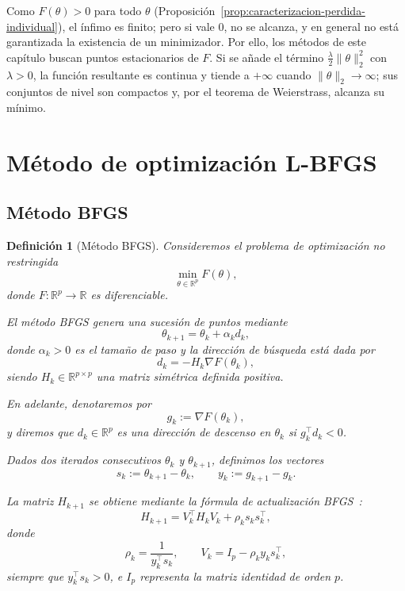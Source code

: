 \documentclass[a4paper,openany,oneside,10pt]{report}
\theoremstyle{pnlTeorema}
\theoremstyle{pnlDefinicion}
\newtheorem{definicion}{Definición}[section]
\theoremstyle{pnlObservacion}
\begin{document}
Como $F(\theta)>0$ para todo $\theta$ (Proposición~\ref{prop:caracterizacion-perdida-individual}), el ínfimo es finito; pero si vale $0$, no se alcanza, y en general no está garantizada la existencia de un minimizador. Por ello, los métodos de este capítulo buscan puntos estacionarios de $F$. Si se añade el término $\frac\lambda2\|\theta\|_2^2$ con $\lambda>0$, la función resultante es continua y tiende a $+\infty$ cuando $\|\theta\|_2\to\infty$; sus conjuntos de nivel son compactos y, por el teorema de Weierstrass, alcanza su mínimo.

\section{Método de optimización L-BFGS}

\subsection{Método BFGS}
\label{subsec:metodo-bfgs}

\begin{definicion}[Método BFGS]
Consideremos el problema de optimización no restringida
\[
    \min_{\theta\in\mathbb{R}^p} F(\theta),
\]
donde $F:\mathbb{R}^p\to\mathbb{R}$ es diferenciable.

El método BFGS genera una sucesión de puntos mediante
\[
    \theta_{k+1}=\theta_k+\alpha_k d_k,
\]
donde $\alpha_k>0$ es el tamaño de paso y la dirección de
búsqueda está dada por
\[
    d_k=-H_k\nabla F(\theta_k),
\]
siendo $H_k\in\mathbb{R}^{p\times p}$ una matriz simétrica
definida positiva.

En adelante, denotaremos por
\[
    g_k:=\nabla F(\theta_k),
\]
y diremos que $d_k\in\mathbb{R}^p$ es una \emph{dirección de descenso} en $\theta_k$ si $g_k^\top d_k<0$.

Dados dos iterados consecutivos $\theta_k$ y $\theta_{k+1}$,
definimos los vectores
\[
    s_k:=\theta_{k+1}-\theta_k,
    \qquad
    y_k:=g_{k+1}-g_k.
\]

La matriz $H_{k+1}$ se obtiene mediante la fórmula de
actualización BFGS~\cite[ecs.~(1.98)--(1.99), p.~38]{andrei2020}:
\begin{equation}
    \label{eq:actualizacion-bfgs}
    H_{k+1}
    =
    V_k^\top H_k V_k+\rho_k s_k s_k^\top,
\end{equation}
donde
\[
    \rho_k=\frac{1}{y_k^\top s_k},
    \qquad
    V_k=I_p-\rho_k y_k s_k^\top,
\]
siempre que $y_k^\top s_k>0$, e $I_p$ representa la matriz
identidad de orden $p$.
\end{definicion}
\end{document}
